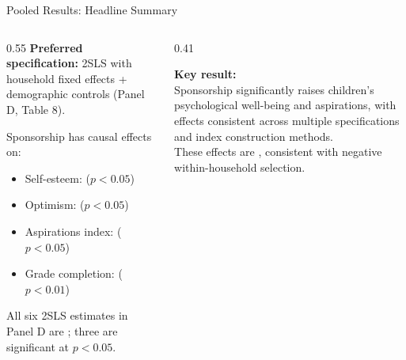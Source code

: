 \documentclass[aspectratio=169, 10pt]{beamer}
\begin{document}
\begin{frame}{Pooled Results: Headline Summary}
  \begin{columns}
    \begin{column}{0.55\textwidth}
      \textbf{Preferred specification:} 2SLS with household fixed effects + demographic controls (Panel D, Table 8).

      \vspace{0.5em}
      Sponsorship has  causal effects on:
      \begin{itemize}
        \item Self-esteem:  ($p < 0.05$)
        \item Optimism:  ($p < 0.05$)
        \item Aspirations index:  ($p < 0.05$)
        \item Grade completion:  ($p < 0.01$)
      \end{itemize}
      \vspace{0.4em}
      All six 2SLS estimates in Panel D are ; three are significant at $p < 0.05$.
    \end{column}
    \begin{column}{0.41\textwidth}
      \begin{resultbox}
        \textbf{Key result:}\\[0.4em]
        Sponsorship significantly raises children's psychological well-being and aspirations, with effects consistent across multiple specifications and index construction methods.\\[0.5em]
        These effects are , consistent with negative within-household selection.
      \end{resultbox}
    \end{column}
  \end{columns}
\end{frame}
\end{document}
